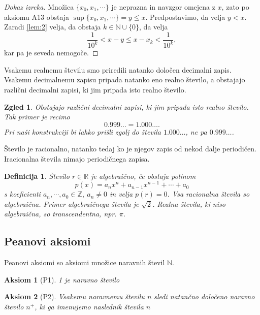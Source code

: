\documentclass[10pt, a4paper]{article}
\newtheorem{defi}{Definicija}[section]
\newtheorem{aksiom}{Aksiom}[section]
\newenvironment{noticeB}{%
  \tcolorbox[%
  notitle,
  empty,
  enhanced,  %
  breakable,
  coltext=black,
  colback=white, 
  fontupper=\rmfamily,
  parbox=false,
  noparskip,
  sharp corners,
  boxrule=-1pt,  %
  frame hidden,
  left=7pt,  %
  right=7pt,
  top=5pt,
  bottom=5pt,
  before skip=2.5ex plus 2pt,
  after skip=2.5ex plus 2pt,
  borderline west = {1.5pt}{-0.1pt}{blue!30!black}, %
  overlay unbroken and last={%
    \draw[color=black, line width=1.25pt]
    ($(frame.south west)+(1.pt, -0.1pt)$) -- ++(2em, 0);
  }
  ]}
{\endtcolorbox}
\newenvironment{definicija}{\begin{defi}\begin{noticeB}}{%
    \end{noticeB}\end{defi}}
\newtheorem{zgled}{Zgled}[section]
\newenvironment{noticeC}{%
  \tcolorbox[%
  notitle,
  empty,
  enhanced,  %
  breakable,
  coltext=black, 
  fontupper=\rmfamily,
  parbox=false,
  noparskip,
  sharp corners,
  boxrule=-1pt,  %
  frame hidden,
  left=7pt,  %
  right=7pt,
  top=5pt,
  bottom=5pt,
  before skip=2.5ex plus 2pt,
  after skip=2.5ex plus 2pt,
  overlay unbroken and last={%
  },
  ]}
{\endtcolorbox}
\newcommand{\N}{\mathbb {N}}
\newcommand{\Z}{\mathbb {Z}}
\newcommand{\R}{\mathbb {R}}
\begin{document}
\begin{noticeC}
    \begin{proof}[Dokaz izreka]
        Množica $\{x_0,x_1,\cdots\}$ je neprazna in navzgor omejena z $x$, zato po aksiomu A13 obstaja $\sup \{x_0,x_1,\cdots\} = y \leq x$. Predpostavimo, da velja $y<x$.     
        Zaradi \ref{lem:2} velja, da obstaja $k\in \N \cup \{0\}$, da velja $$\frac{1}{10^k} < x-y \leq x-x_k < \frac{1}{10^k},$$ kar pa je seveda nemogoče.
    \end{proof}
\end{noticeC}

Vsakemu realnemu številu smo priredili natanko določen decimalni zapis. Vsakemu decimalnemu zapisu pripada natanko eno realno število, a obstajajo različni decimalni zapisi, ki jim pripada isto realno število.

\begin{zgled}
    Obstajajo različni decimalni zapisi, ki jim pripada isto realno število. Tak primer je recimo 
    $$0.999\ldots = 1.000\ldots.$$
    Pri naši konstrukciji bi lahko prišli zgolj do števila $1.000\ldots$, ne pa $0.999\ldots$.
\end{zgled}

Število je racionalno, natanko tedaj ko je njegov zapis od nekod dalje periodičen. Iracionalna števila nimajo periodičnega zapisa.

\begin{definicija}
    Število $r \in \R$ je {algebraično}, če obstaja polinom $$p(x)= a_n x^n + a_{n-1}x^{n-1} + \cdots + a_0$$ s koeficienti $a_n, \cdots, a_0 \in \Z,\ a_n \neq 0$ in velja $p(r) = 0$. Vsa racionalna števila so algebraična. Primer algebraičnega števila je $\sqrt{2}$.
    Realna števila, ki niso algebraična, so transcendentna, npr. $\pi$.
\end{definicija}

\subsection{Peanovi aksiomi}

Peanovi aksiomi so aksiomi množice naravnih števil $\N$.

\begin{aksiom}[P1]
    1 je naravno število
\end{aksiom}

\begin{aksiom}[P2]
    Vsakemu naravnemu številu $n$ sledi natančno določeno naravno število $n^+$, ki ga imenujemo naslednik števila $n$
\end{aksiom}
\end{document}
